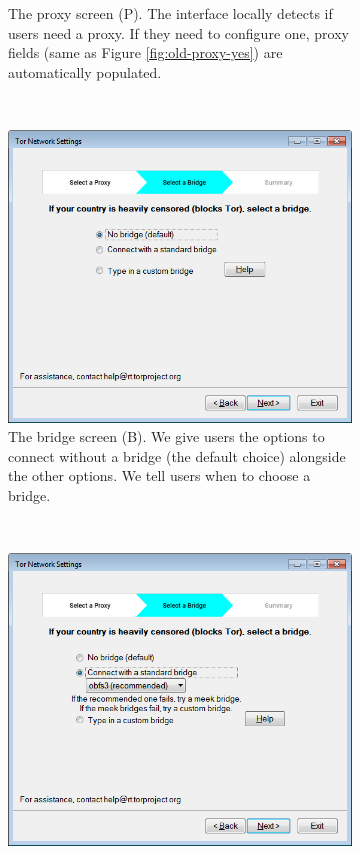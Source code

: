 \documentclass[USenglish,oneside,twocolumn]{article}
\begin{document}
\begin{figure}
\begin{subfigure}[b]{0.30\textwidth}
	\centering\captionsetup{width=1.5\linewidth}%
	\caption{The proxy screen (P). The interface locally detects if users need a proxy. If they need to configure one, proxy fields (same as Figure \ref{fig:old-proxy-yes}) are automatically populated.}
	\label{fig:new-proxy}
\end{subfigure}
~~~~~~~~~~
\begin{subfigure}[b]{0.30\textwidth}
	\includegraphics[width=\textwidth]{screenshots/NEW-bridgeSettings.png}
	\centering\captionsetup{width=1.5\linewidth}%
	\caption{The bridge screen (B). We give users the options to connect  without a bridge (the default choice) alongside the other options. We tell users when to choose a bridge. }
	\label{fig:new-nobridge}
\end{subfigure}
~~~~~~~~~~~~~~~~~~~~~~~~~
\begin{subfigure}[b]{0.30\textwidth}
	\includegraphics[width=\textwidth]{screenshots/NEW-bridgeSettings-default.png}

\end{subfigure}
\end{figure}
\end{document}
